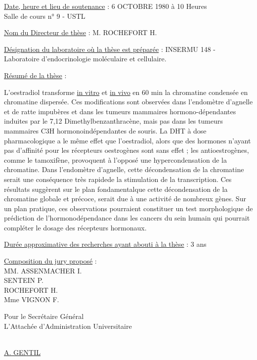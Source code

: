 \uline{Date, heure et lieu de soutenance} : 6 OCTOBRE 1980 à 10 Heures\\
Salle de cours n° 9 - USTL

\uline{Nom du Directeur de thèse} : M. ROCHEFORT H.

\uline{Désignation du laboratoire où la thèse est préparée} : INSERMU 148 - Laboratoire d'endocrinologie moléculaire et cellulaire.

\uline{Résumé de la thèse} :

L'oestradiol transforme \uline{in vitro} et \uline{in vivo} en 60 min la chromatine condensée en chromatine dispersée. Ces modifications sont observées dans l'endomètre d'agnelle et de ratte impubères et dans les tumeurs mammaires hormono-dépendantes induites par le 7,12 Dimethylbenzanthracène, mais pas dans les tumeurs mammaires C3H hormonoindépendantes de souris. La DHT à dose pharmacologique a le même effet que l'oestradiol, alors que des hormones n'ayant pas d'affinité pour les récepteurs oestrogènes sont sans effet ; les antioestrogènes, comme le tamoxifène, provoquent à l'opposé une hypercondensation de la chromatine. Dans l'endomètre d'agnelle, cette décondensation de la chromatine serait une conséquence très rapidede la stimulation de la transcription. Ces résultats suggèrent sur le plan fondamental\unsure{:}que cette décondensation de la chromatine globale et précoce, serait due à une activité de nombreux gènes. Sur un plan pratique, ces observations pourraient constituer un test morphologique de prédiction de l'hormonodépendance dans les cancers du sein humain qui pourrait compléter le dosage des récepteurs hormonaux.

\uline{Durée approximative des recherches ayant abouti à la thèse} : 3 ans

\uline{Composition du jury proposé} :\\
MM. ASSENMACHER I.\\
SENTEIN P.\\
ROCHEFORT H.\\
Mme VIGNON F.

Pour le Secrétaire Général\\
L'Attachée d'Administration Universitaire

\uline{}\\
\uline{A. GENTIL}

